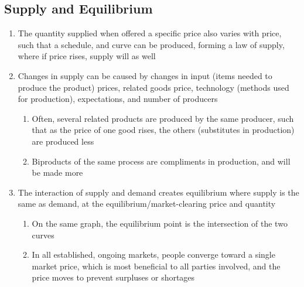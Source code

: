 \documentclass[11 pt, twoside]{article}
\begin{document}
\subsection{Supply and Equilibrium}
\begin{enumerate}
\item The quantity supplied when offered a specific price also varies with price, such that a schedule, and curve can be produced, forming a law of supply, where if price rises, supply will as well
\item Changes in supply can be caused by changes in input (items needed to produce the product) prices, related goods price, technology (methods used for production), expectations, and number of producers
\begin{enumerate}
\item Often, several related products are produced by the same producer, such that as the price of one good rises, the others (substitutes in production) are produced less
\item Biproducts of the same process are compliments in production, and will be made more
\end{enumerate}
\item The interaction of supply and demand creates equilibrium where supply is the same as demand, at the equilibrium/market-clearing price and quantity
\begin{enumerate}
\item On the same graph, the equilibrium point is the intersection of the two curves
\item In all established, ongoing markets, people converge toward a single market price, which is most beneficial to all parties involved, and the price moves to prevent surpluses or shortages
\end{enumerate}
\end{enumerate}
\end{document}
